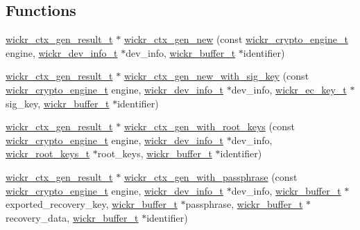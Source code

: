 \subsection*{Functions}
\begin{DoxyCompactItemize}
\item 
\mbox{\hyperlink{structwickr__ctx__gen__result}{wickr\+\_\+ctx\+\_\+gen\+\_\+result\+\_\+t}} $\ast$ \mbox{\hyperlink{group__wickr__ctx_gaa8904ab3687a22f8d291f5976d05a0e5}{wickr\+\_\+ctx\+\_\+gen\+\_\+new}} (const \mbox{\hyperlink{structwickr__crypto__engine}{wickr\+\_\+crypto\+\_\+engine\+\_\+t}} engine, \mbox{\hyperlink{structwickr__dev__info}{wickr\+\_\+dev\+\_\+info\+\_\+t}} $\ast$dev\+\_\+info, \mbox{\hyperlink{structwickr__buffer}{wickr\+\_\+buffer\+\_\+t}} $\ast$identifier)
\item 
\mbox{\hyperlink{structwickr__ctx__gen__result}{wickr\+\_\+ctx\+\_\+gen\+\_\+result\+\_\+t}} $\ast$ \mbox{\hyperlink{group__wickr__ctx_ga458f74fb060fb98da491d733e51fc3ef}{wickr\+\_\+ctx\+\_\+gen\+\_\+new\+\_\+with\+\_\+sig\+\_\+key}} (const \mbox{\hyperlink{structwickr__crypto__engine}{wickr\+\_\+crypto\+\_\+engine\+\_\+t}} engine, \mbox{\hyperlink{structwickr__dev__info}{wickr\+\_\+dev\+\_\+info\+\_\+t}} $\ast$dev\+\_\+info, \mbox{\hyperlink{structwickr__ec__key}{wickr\+\_\+ec\+\_\+key\+\_\+t}} $\ast$sig\+\_\+key, \mbox{\hyperlink{structwickr__buffer}{wickr\+\_\+buffer\+\_\+t}} $\ast$identifier)
\item 
\mbox{\hyperlink{structwickr__ctx__gen__result}{wickr\+\_\+ctx\+\_\+gen\+\_\+result\+\_\+t}} $\ast$ \mbox{\hyperlink{group__wickr__ctx_ga286a513a606b6643f796539413357c34}{wickr\+\_\+ctx\+\_\+gen\+\_\+with\+\_\+root\+\_\+keys}} (const \mbox{\hyperlink{structwickr__crypto__engine}{wickr\+\_\+crypto\+\_\+engine\+\_\+t}} engine, \mbox{\hyperlink{structwickr__dev__info}{wickr\+\_\+dev\+\_\+info\+\_\+t}} $\ast$dev\+\_\+info, \mbox{\hyperlink{structwickr__root__keys}{wickr\+\_\+root\+\_\+keys\+\_\+t}} $\ast$root\+\_\+keys, \mbox{\hyperlink{structwickr__buffer}{wickr\+\_\+buffer\+\_\+t}} $\ast$identifier)
\item 
\mbox{\hyperlink{structwickr__ctx__gen__result}{wickr\+\_\+ctx\+\_\+gen\+\_\+result\+\_\+t}} $\ast$ \mbox{\hyperlink{group__wickr__ctx_gaab0b2731d76d6ea91afd1b147c53a29a}{wickr\+\_\+ctx\+\_\+gen\+\_\+with\+\_\+passphrase}} (const \mbox{\hyperlink{structwickr__crypto__engine}{wickr\+\_\+crypto\+\_\+engine\+\_\+t}} engine, \mbox{\hyperlink{structwickr__dev__info}{wickr\+\_\+dev\+\_\+info\+\_\+t}} $\ast$dev\+\_\+info, \mbox{\hyperlink{structwickr__buffer}{wickr\+\_\+buffer\+\_\+t}} $\ast$exported\+\_\+recovery\+\_\+key, \mbox{\hyperlink{structwickr__buffer}{wickr\+\_\+buffer\+\_\+t}} $\ast$passphrase, \mbox{\hyperlink{structwickr__buffer}{wickr\+\_\+buffer\+\_\+t}} $\ast$recovery\+\_\+data, \mbox{\hyperlink{structwickr__buffer}{wickr\+\_\+buffer\+\_\+t}} $\ast$identifier)

\end{DoxyCompactItemize}
